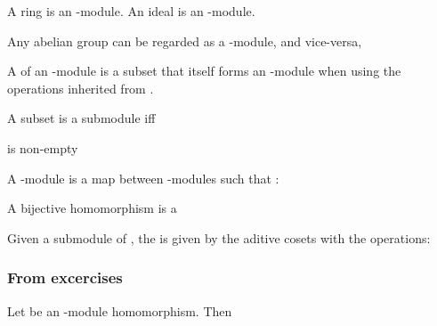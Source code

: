 \begin{Le}
\begin{A}
\begin{R} A ring  is an -module. An ideal  is an -module. \end{R}
\begin{R} Any abelian group can be regarded as a -module, and vice-versa, \end{R}

\begin{D} A  of an -module  is a subset that itself forms an -module when using the operations inherited from . \end{D}

\begin{Le} A subset  is a submodule iff 
\begin{compactitem}
\item {} is non-empty
\item {}
\item {}
\end{compactitem}
\end{Le}

\begin{D} A -module  is a map  between -modules such that :
\begin{compactitem}
\item {}
\item {}
\end{compactitem}
\end{D}

\begin{D} A bijective homomorphism is a  \end{D}

\begin{D} Given a submodule  of , the   is given by the aditive cosets  with the operations:
\begin{compactitem}
\item {}
\item {}
\end{compactitem}
\end{D}

\subsubsection{From excercises}
\begin{T} Let  be an -module homomorphism. Then  \end{T}


\end{A}
\end{Le}
